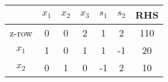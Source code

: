 \begin{tabular}{c|c c c c c|c}
    & $x_1$ & $x_2$ & $x_3$ & $s_1$ & $s_2$ & RHS \\ \hline
    z\--row & 0 & 0 & 2 & 1 & 2 & 110 \\ \hline
$x_1$ & 1 & 0 & 1 & 1 & -1 & 20 \\
$x_2$ & 0 & 1 & 0 & -1 & 2 & 10 \\
\end{tabular}

